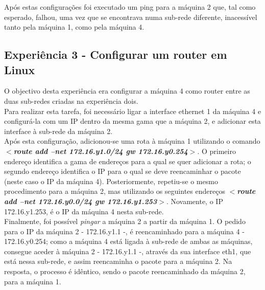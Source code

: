 \documentclass[a4paper]{article}
\begin{document}
Após estas configurações foi executado um ping para a máquina 2 que, tal como esperado, falhou, uma vez que se encontrava numa sub-rede diferente, inacessível tanto pela máquina 1, como pela máquina 4.

\subsection{Experiência 3 - Configurar um router em Linux}
O objectivo desta experiência era configurar a máquina 4 como router entre as duas sub-redes criadas na experiência dois.\\
Para realizar esta tarefa, foi necessário ligar a interface ethernet 1 da máquina 4 e configurá-la com um IP dentro da mesma gama que a máquina 2, e adicionar esta interface à sub-rede da máquina 2.\\
Após esta configuração, adicionou-se uma rota à máquina 1 utilizando o comando \textbf{\textit{$<$route add –net  172.16.y1.0/24 gw 172.16.y0.254$>$}}. O primeiro endereço identifica a gama de endereços para a qual se quer adicionar a rota; o segundo endereço identifica o IP para o qual se deve reencaminhar o pacote (neste caso o IP da máquina 4). Posteriormente, repetiu-se o mesmo procedimento para a máquina 2, mas utilizando os seguintes endereços \textbf{\textit{$<$route add –net 172.16.y0.0/24 gw 172.16.y1.253$>$}}. Novamente, o IP 172.16.y1.253, é o IP da máquina 4 nesta sub-rede.\\
Finalmente, foi possível \emph{pingar} a máquina 2 a partir da máquina 1. O pedido para o IP da máquina 2 - 172.16.y1.1 -, é reencaminhado para a máquina 4 - 172.16.y0.254; como a máquina 4 está ligada à sub-rede de ambas as máquinas, consegue aceder à máquina 2 - 172.16.y1.1 -, através da sua interface eth1, que está nessa sub-rede, e assim reencaminha o pacote para a máquina 2. Na resposta, o processo é idêntico, sendo o pacote reencaminhado da máquina 2, para a máquina 1.
\end{document}
